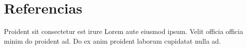 \section{Referencias}
Proident sit consectetur est irure Lorem aute eiusmod ipsum. Velit officia officia minim do proident ad. Do ex anim proident laborum cupidatat nulla ad.